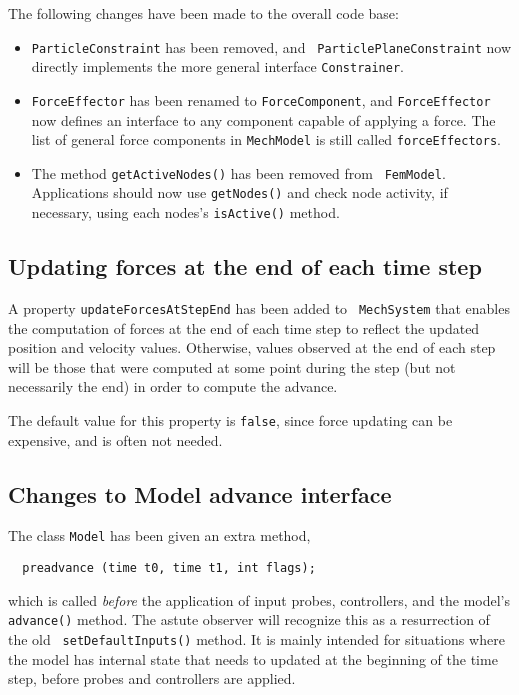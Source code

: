 \documentclass{article}
\begin{document}
The following changes have been made to the overall code base:

\begin{itemize}

\item {\tt ParticleConstraint} has been removed, and {\tt
ParticlePlaneConstraint} now directly implements the more general
interface {\tt Constrainer}.

\item {\tt ForceEffector} has been renamed to {\tt ForceComponent},
and {\tt ForceEffector} now defines an interface to any component
capable of applying a force. The list of general force components in
{\tt MechModel} is still called {\tt forceEffectors}.

\item The method {\tt getActiveNodes()} has been removed from {\tt
FemModel}. Applications should now use {\tt getNodes()} and check node
activity, if necessary, using each nodes's {\tt isActive()} method.

\end{itemize}

\subsection*{Updating forces at the end of each time step}

A property {\tt updateForcesAtStepEnd} has been added to {\tt
MechSystem} that enables the computation of forces at the end of each
time step to reflect the updated position and velocity values.
Otherwise, values observed at the end of each step will be those that
were computed at some point during the step (but not necessarily the
end) in order to compute the advance.

The default value for this property is {\tt false}, since force
updating can be expensive, and is often not needed.

\subsection*{Changes to Model advance interface}

The class {\tt Model} has been given an extra method,

\begin{verbatim}
  preadvance (time t0, time t1, int flags);
\end{verbatim}

which is called {\it before} the application of input probes,
controllers, and the model's {\tt advance()} method. The astute
observer will recognize this as a resurrection of the old {\tt
setDefaultInputs()} method. It is mainly intended for situations where
the model has internal state that needs to updated at the beginning of
the time step, before probes and controllers are applied.
\end{document}
